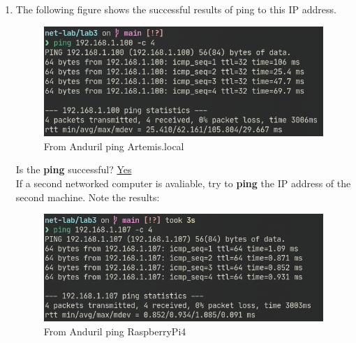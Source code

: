 \documentclass[a4paper]{ctexart}
\begin{document}
\begin{enumerate}
      \newpage
      \item The following figure shows the successful results of ping to this IP address.
      \begin{figure}[H]
        \includegraphics*[width=1.0\textwidth]{fig/ping1.png}
        \caption[]{From Anduril ping Artemis.local}
      \end{figure}
      Is the \textbf{ping} successful? \underline{Yes}\\
      If a second networked computer is avaliable, try to \textbf{ping} the IP address of the
      second machine. Note the results:
      \begin{figure}[H]
        \includegraphics*[width=1.0\textwidth]{fig/ping2.png}
        \caption[]{From Anduril ping RaspberryPi4}
      \end{figure}


\end{enumerate}
\end{document}
